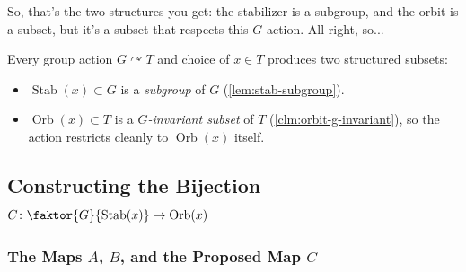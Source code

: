\begin{speech}[00:22:26 - 00:22:36]
So, that's the two structures you get: the stabilizer is a subgroup, and the orbit is a subset, but it's a subset that respects this $G$-action. All right, so...
\end{speech}

\begin{content}
\begin{steps}
Every group action $G \curvearrowright T$ and choice of $x \in T$ produces two structured subsets:
\begin{itemize}
    \item $\operatorname{Stab}(x) \subset G$ is a \emph{subgroup} of $G$ (\cref{lem:stab-subgroup}).
    \item $\operatorname{Orb}(x) \subset T$ is a \emph{$G$-invariant subset} of $T$ (\cref{clm:orbit-g-invariant}), so the action restricts cleanly to $\operatorname{Orb}(x)$ itself.
\end{itemize}
\end{steps}
\end{content}

\begin{hidden}
\end{hidden}

\subsection{Constructing the Bijection \texorpdfstring{$C \colon \faktor{G}{\operatorname{Stab}(x)} \to \operatorname{Orb}(x)$}{C: G/Stab(x) -> Orb(x)}}

\subsubsection{The Maps \texorpdfstring{$A$, $B$, and the Proposed Map $C$}{A, B, and the Proposed Map C}}

